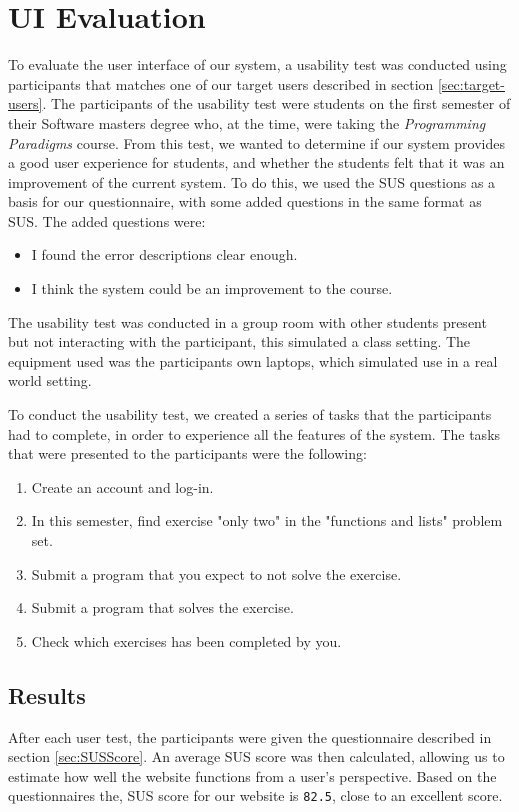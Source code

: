 \section{UI Evaluation} \label{UIEval}
To evaluate the user interface of our system, a usability test was conducted using participants that matches one of our target users described in section \ref{sec:target-users}.
The participants of the usability test were students on the first semester of their Software masters degree who, at the time, were taking the \textit{Programming Paradigms} course.
From this test, we wanted to determine if our system provides a good user experience for students, and whether the students felt that it was an improvement of the current system.
To do this, we used the SUS questions as a basis for our questionnaire, with some added questions in the same format as SUS. The added questions were:
\begin{itemize}
    \item I found the error descriptions clear enough.
    \item I think the system could be an improvement to the course.
\end{itemize}

The usability test was conducted in a group room with other students present but not interacting with the participant, this simulated a class setting.
The equipment used was the participants own laptops, which simulated use in a real world setting.

To conduct the usability test, we created a series of tasks that the participants had to complete, in order to experience all the features of the system.
The tasks that were presented to the participants were the following:
\begin{enumerate}
    \item Create an account and log-in.
    \item In this semester, find exercise "only two" in the "functions and lists" problem set.
    \item Submit a program that you expect to not solve the exercise.
    \item Submit a program that solves the exercise.
    \item Check which exercises has been completed by you.
\end{enumerate}


\subsection{Results} \label{UiResults}
After each user test, the participants were given the questionnaire described in section \ref{sec:SUSScore}.
An average SUS score was then calculated, allowing us to estimate how well the website functions from a user's perspective.
Based on the questionnaires the, SUS score for our website is \texttt{82.5}, close to an excellent score.

